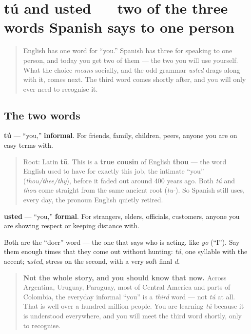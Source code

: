 \section[tú / usted]{tú and usted — two of the three words Spanish says to one person}

\label{lesson:ES-C03-tu-usted}



\begin{quote}
English has one word for \textquotedblleft{}you.\textquotedblright{} Spanish has three for speaking to one person, and today you get two of them — the two you will use yourself. What the choice \emph{means} socially, and the odd grammar \emph{usted} drags along with it, comes next. The third word comes shortly after, and you will only ever need to recognise it.
\end{quote}

\subsection*{The two words}
\textbf{tú} — \textquotedblleft{}you,\textquotedblright{} \textbf{informal}. For friends, family, children, peers, anyone you are on easy terms with.

\begin{quote}
Root: Latin \textbf{tū}. This is a \textbf{true cousin} of English \textbf{thou} — the word English used to have for exactly this job, the intimate \textquotedblleft{}you\textquotedblright{} (\emph{thou/thee/thy}), before it faded out around 400 years ago. Both \emph{tú} and \emph{thou} come straight from the same ancient root (\emph{tu-}). So Spanish still uses, every day, the pronoun English quietly retired.
\end{quote}

\textbf{usted} — \textquotedblleft{}you,\textquotedblright{} \textbf{formal}. For strangers, elders, officials, customers, anyone you are showing respect or keeping distance with.

Both are the \textquotedblleft{}doer\textquotedblright{} word — the one that says who is acting, like \emph{yo} (\textquotedblleft{}I\textquotedblright{}). Say them enough times that they come out without hunting: \emph{tú}, one syllable with the accent; \emph{usted}, stress on the second, with a very soft final \emph{d}.

\begin{quote}
\textbf{Not the whole story, and you should know that now.} Across Argentina, Uruguay, Paraguay, most of Central America and parts of Colombia, the everyday informal \textquotedblleft{}you\textquotedblright{} is a \emph{third} word — not \emph{tú} at all. That is well over a hundred million people. You are learning \emph{tú} because it is understood everywhere, and you will meet the third word shortly, only to recognise.
\end{quote}

